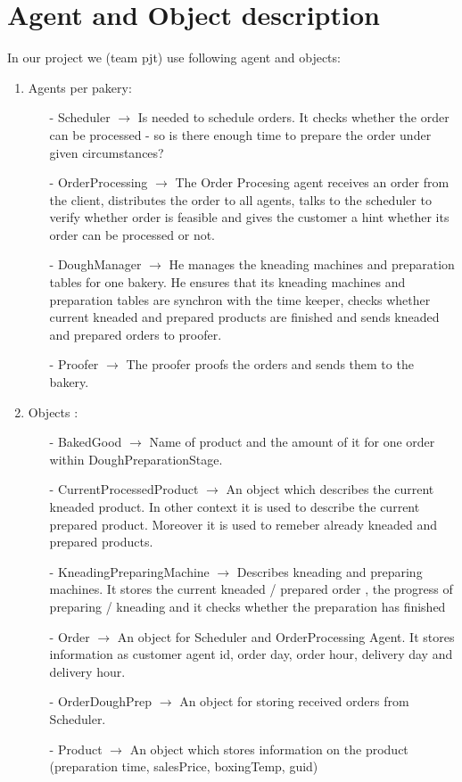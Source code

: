 \section*{Agent and Object description}
In our project we (team pjt) use following agent and objects:
\begin{enumerate}
    \item Agents per pakery:
        \begin{enumerate}
            \item [-] Scheduler $\rightarrow$ Is needed to schedule orders. It checks whether the order can be processed - so is there enough time to prepare the order
            under given circumstances?
            \item [-] OrderProcessing $\rightarrow$ The Order Procesing agent receives an order from the client, distributes the order to all agents, talks to the scheduler
            to verify whether order is feasible and gives the customer a hint whether its order can be processed or not.
            \item [-] DoughManager $\rightarrow$ He manages the kneading machines and preparation tables for one bakery. He ensures that its kneading machines and preparation
            tables are synchron with the time keeper, checks whether current kneaded and prepared products are finished and sends kneaded and prepared orders to proofer.
            \item [-] Proofer $\rightarrow$ The proofer proofs the orders and sends them to the bakery.
        \end{enumerate}
    \item Objects :
        \begin{enumerate}
            \item [-] BakedGood $\rightarrow$ Name of product and the amount of it for one order within DoughPreparationStage.
            \item [-] CurrentProcessedProduct $\rightarrow$ An object which describes the current kneaded product. In other
            context it is used to describe the current prepared product. Moreover it is used to remeber already kneaded
            and prepared products.
            \item [-] KneadingPreparingMachine $\rightarrow$ Describes kneading and preparing machines. It stores the current
            kneaded / prepared order , the progress of preparing / kneading and it checks whether the preparation has finished
            \item [-] Order $\rightarrow$ An object for Scheduler and OrderProcessing Agent. It stores information as customer
            agent id, order day, order hour, delivery day and delivery hour.
            \item [-] OrderDoughPrep $\rightarrow$ An object for storing received orders from Scheduler.
            \item [-] Product $\rightarrow$ An object which stores information on the product (preparation time,
            salesPrice, boxingTemp, guid)
        \end{enumerate}
\end{enumerate}